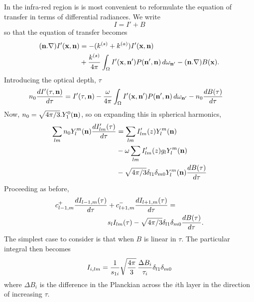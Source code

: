 In the infra-red region is is most convenient to reformulate the equation
of transfer in terms of differential radiances. We write
\begin{equation}
I=I'+B
\end{equation}
so that the equation of transfer becomes
\begin{equation}
\begin{split}
(\mathbf{n} . \nabla) I'(\mathbf{x}, \mathbf{n}) & = -(k^{(s)} + k^{(a)}) I' (\mathbf{x}, \mathbf{n}) \\
& + { k^{(s)} \over
{4 \pi} } \int_{\Omega} I'(\mathbf{x},\mathbf{n}') P(\mathbf{n}', \mathbf{n}) \, d\omega_{\mathbf{n}'} 
- (\mathbf{n} . \nabla) B(\mathbf{x}).
\end{split}
\end{equation}
Introducing the optical depth, $\tau$
\begin{equation}
\begin{split}
n_0 {{d I'(\tau, \mathbf{n})} \over {d\tau} }& = I' (\tau, \mathbf{n}) 
 - {\omega \over
{4 \pi} }  \int_{\Omega} I'(\mathbf{x},\mathbf{n}') P(\mathbf{n}', \mathbf{n}) \, d\omega_{\mathbf{n}'} 
- n_0 {{d B(\tau)}\over {d\tau}}
\end{split}
\end{equation}
Now, $n_0=\sqrt{4\pi/3}. Y_1^0(\mathbf{n})$, so on expanding this in spherical
harmonics,
\begin{equation}
\begin{split}
\sum_{lm} n_0 Y_l^m (\mathbf{n}) { {dI'_{lm} (\tau)} \over {d\tau} } &= 
\sum_{lm} I'_{lm}(z) Y_l^m (\mathbf{n}) \\
&- \omega \sum_{lm} I'_{lm}(z) g_l Y_l^m (\mathbf{n}) \\
&- \sqrt{4\pi/3} \delta_{l1} \delta_{m0} Y_l^m (\mathbf{n}) 
{{d B(\tau)}\over {d\tau}}
\end{split}
\end{equation}
Proceeding as before,
\begin{equation}
\begin{split}
c_{l-1,m}^+ { {dI_{l-1,m}(\tau)} \over {d\tau} } &+
c_{l+1,m}^- { {dI_{l+1,m}(\tau)} \over {d\tau} } = \\
& s_l I_{lm}(\tau) - \sqrt{4\pi/3} \delta_{l1} \delta_{m0} 
{{d B(\tau)}\over {d\tau}}.
\end{split}
\end{equation}
The simplest case to consider is that when $B$ is linear in $\tau$. The 
particular integral then becomes
\begin{equation}
I_{i, lm}={1\over s_{1i}} \sqrt{{4\pi}\over 3} \, {{\Delta B_i}\over\tau_i}
\delta_{l1}\delta_{m0}
\end{equation}
where $\Delta B_i$ is the difference in the Planckian across the $i$th
layer in the direction of increasing $\tau$.

